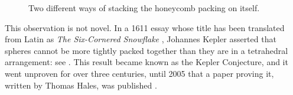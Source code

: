 \begin{figure}[bt]
    \centering
    \begin{subfigure}{0.48\linewidth}
        \centering
        \subcaption{}
        \label{Ch1:Subfig:3D_Triangular_Stacking}
    \end{subfigure}
    \begin{subfigure}{0.48\linewidth}
        \centering
        \subcaption{}
        \label{Ch1:Subfig:3D_Hexagonal_Stacking}
    \end{subfigure}
    \caption{Two different ways of stacking the honeycomb packing on itself.}
    \label{Ch1:Fig:2_Optimal_3D_Packings}
\end{figure}

This observation is not novel. In a 1611 essay whose title has been translated from Latin as \textit{The Six-Cornered Snowflake} \cite{KeplerSnowflake}, Johannes Kepler asserted that spheres cannot be more tightly packed together than they are in a tetrahedral arrangement: see . This result became known as the Kepler Conjecture, and it went unproven for over three centuries, until 2005 that a paper proving it, written by Thomas Hales, was published \cite{HalesKeplerInformal}.

